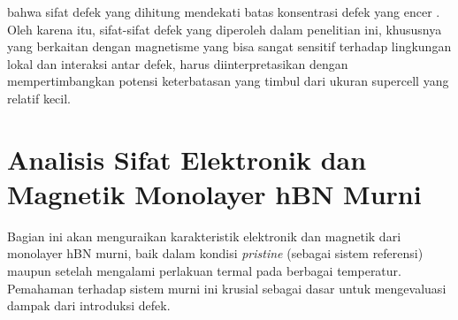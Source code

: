bahwa sifat defek yang dihitung mendekati batas konsentrasi defek yang encer \citep{Freysoldt2014}. Oleh karena itu, sifat-sifat defek yang diperoleh dalam penelitian ini, khususnya yang berkaitan dengan magnetisme yang bisa sangat sensitif terhadap lingkungan lokal dan interaksi antar defek, harus diinterpretasikan dengan mempertimbangkan potensi keterbatasan yang timbul dari ukuran supercell yang relatif kecil. \section{Analisis Sifat Elektronik dan Magnetik Monolayer hBN Murni}
\label{sec:hbn_murni}
Bagian ini akan menguraikan karakteristik elektronik dan magnetik dari monolayer hBN murni, baik dalam kondisi \textit{pristine} (sebagai sistem referensi) maupun setelah mengalami perlakuan termal pada berbagai temperatur. Pemahaman terhadap sistem murni ini krusial sebagai dasar untuk mengevaluasi dampak dari introduksi defek. 
